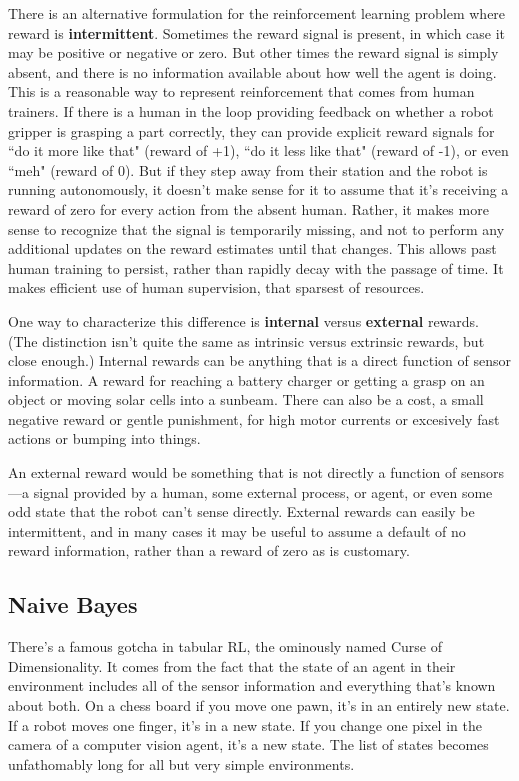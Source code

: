 There is an alternative formulation for the reinforcement learning problem where
reward is \textbf{intermittent}. Sometimes the reward signal is present, in which case
it may be positive or negative or zero. But other times the reward signal is
simply absent, and there is no information available about how well the agent is doing.
This is a reasonable way to represent reinforcement that comes from human trainers.
If there is a human in the loop providing feedback on whether a robot gripper
is grasping a part correctly, they can provide explicit reward signals for ``do it
more like that" (reward of +1), ``do it less like that" (reward of -1), or even
``meh" (reward of 0). But if they step away from their station and the robot
is running autonomously, it doesn’t make sense for it to assume that it’s
receiving a reward of zero for every action from the absent human. Rather, it makes
more sense to recognize that the signal is temporarily missing, and not to perform
any additional updates on the reward estimates until that changes. This allows past
human training to persist, rather than rapidly decay with the passage of time.
It makes efficient use of human supervision, that sparsest of resources.

One way to characterize this difference is \textbf{internal} versus \textbf{external} rewards.
(The distinction isn't quite the same as intrinsic versus extrinsic rewards, but close enough.)
Internal rewards can be anything that is a direct function of sensor information.
A reward for reaching a battery charger or getting a grasp on an object or
moving solar cells into a sunbeam. There can also be a cost, a small negative reward
or gentle punishment, for high motor currents or excesively fast actions or
bumping into things.

An external reward would be something that is not directly a function of
sensors---a signal provided by a human, some external process, or agent,
or even some odd state
that the robot can’t sense directly. External rewards can easily be intermittent,
and in many cases it may be useful to assume a default of no reward information,
rather than a reward of zero as is customary.


\subsection{Naive Bayes}
\label{subsec:intronaivebayes}

There's a famous gotcha in tabular RL, the ominously named
Curse of Dimensionality. It comes from the fact that the state of
an agent in their environment includes all of the sensor information
and everything that's known about both. On a chess board if you move
one pawn, it's in an entirely new state. If a robot moves one finger,
it's in a new state. If you change one pixel in the camera of a
computer vision agent, it's a new state. The list of states becomes
unfathomably long for all but very simple environments.

